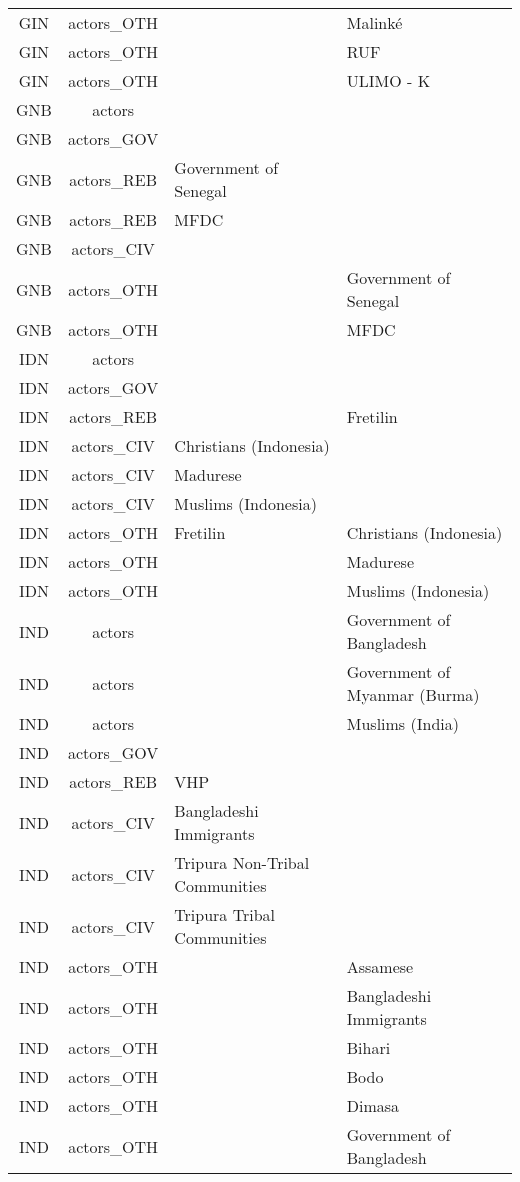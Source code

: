 \documentclass[12pt]{article}
\begin{document}
\begin{center}
\begin{longtable}{|c|c|p{7cm}|p{7cm}|}
  GIN & actors\_OTH &  & Malinké \\ 
  GIN & actors\_OTH &  & RUF \\ 
  GIN & actors\_OTH &  & ULIMO - K \\ 
  GNB & actors &  &  \\ 
  GNB & actors\_GOV &  &  \\ 
  GNB & actors\_REB & Government of Senegal &  \\ 
  GNB & actors\_REB & MFDC &  \\ 
  GNB & actors\_CIV &  &  \\ 
  GNB & actors\_OTH &  & Government of Senegal \\ 
  GNB & actors\_OTH &  & MFDC \\ 
  IDN & actors &  &  \\ 
  IDN & actors\_GOV &  &  \\ 
  IDN & actors\_REB &  & Fretilin \\ 
  IDN & actors\_CIV & Christians (Indonesia) &  \\ 
  IDN & actors\_CIV & Madurese &  \\ 
  IDN & actors\_CIV & Muslims (Indonesia) &  \\ 
  IDN & actors\_OTH & Fretilin & Christians (Indonesia) \\ 
  IDN & actors\_OTH &  & Madurese \\ 
  IDN & actors\_OTH &  & Muslims (Indonesia) \\ 
  IND & actors &  & Government of Bangladesh \\ 
  IND & actors &  & Government of Myanmar (Burma) \\ 
  IND & actors &  & Muslims (India) \\ 
  IND & actors\_GOV &  &  \\ 
  IND & actors\_REB & VHP &  \\ 
  IND & actors\_CIV & Bangladeshi Immigrants &  \\ 
  IND & actors\_CIV & Tripura Non-Tribal Communities &  \\ 
  IND & actors\_CIV & Tripura Tribal Communities &  \\ 
  IND & actors\_OTH &  & Assamese \\ 
  IND & actors\_OTH &  & Bangladeshi Immigrants \\ 
  IND & actors\_OTH &  & Bihari \\ 
  IND & actors\_OTH &  & Bodo \\ 
  IND & actors\_OTH &  & Dimasa \\ 
  IND & actors\_OTH &  & Government of Bangladesh \\ 

\end{longtable}
\end{center}
\end{document}
